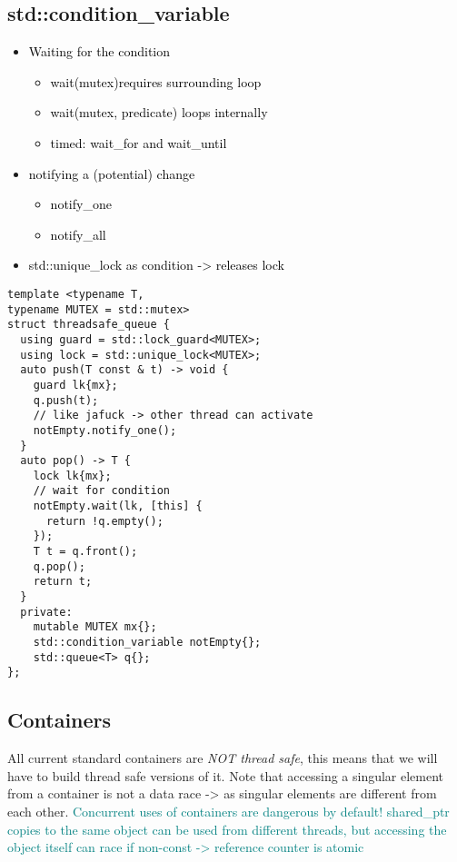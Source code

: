 \documentclass[main.tex,fontsize=8pt,paper=a4,paper=portrait,DIV=calc,]{scrartcl}
\begin{document}
\subsection{std::condition\_variable}
\begin{itemize}
\item \textcolor{black}{Waiting for the condition}
  \begin{itemize}
  \item \textcolor{black}{wait(mutex)requires surrounding loop}
  \item \textcolor{black}{wait(mutex, predicate) loops internally}
  \item \textcolor{black}{timed: wait\_for and wait\_until}
  \end{itemize} 
\item \textcolor{black}{notifying a (potential) change}
  \begin{itemize}
  \item \textcolor{black}{notify\_one}
  \item \textcolor{black}{notify\_all}
  \end{itemize} 
\item \textcolor{black}{std::unique\_lock as condition -> releases lock}
\end{itemize} 
\begin{lstlisting}
template <typename T,
typename MUTEX = std::mutex>
struct threadsafe_queue {
  using guard = std::lock_guard<MUTEX>;
  using lock = std::unique_lock<MUTEX>;
  auto push(T const & t) -> void {
    guard lk{mx};
    q.push(t);
    // like jafuck -> other thread can activate
    notEmpty.notify_one();
  }
  auto pop() -> T {
    lock lk{mx};
    // wait for condition
    notEmpty.wait(lk, [this] {
      return !q.empty();
    });
    T t = q.front();
    q.pop();
    return t;
  }
  private:
    mutable MUTEX mx{};
    std::condition_variable notEmpty{};
    std::queue<T> q{};
};
\end{lstlisting}

\subsection{Containers}
All current standard containers are \emph{NOT thread safe}, this means that we will have to build thread safe versions of it.\newline
Note that accessing a singular element from a container is not a data race -> as singular elements are different from each other.\newline
\textcolor{teal}{Concurrent uses of containers are dangerous by default!}\newline
\textcolor{teal}{shared\_ptr copies to the same object can be used from different threads, but accessing the object
itself can race if non-const -> reference counter is atomic}
\end{document}
